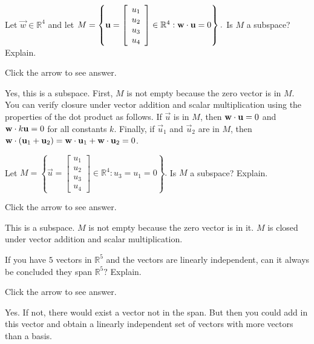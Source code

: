 \documentclass{ximera}
\begin{document}
\begin{problem}\label{prb:5.13} Let $\vec{w}\in \mathbb{R}^{4}$ and let $M=\left\{ \mathbf{u}
=\left[
\begin{array}{c}
u_{1} \\
u_{2} \\
u_{3} \\
u_{4}
\end{array}\right] \in \mathbb{R}^{4}:\mathbf{w}\cdot \mathbf{u}
=0\right\} .$ Is $M$ a subspace? Explain.

Click the arrow to see answer.  
\begin{expandable}{}{}
Yes, this is a subspace.  
First, $M$ is not empty because the zero vector is in $M$.  You can verify closure under vector addition and scalar multiplication using the properties of the dot product as follows.  If $\vec{u}$ is in $M$, then $\mathbf{w}\cdot\mathbf{u}=0$ and $\mathbf{w}\cdot k\mathbf{u}=0$ for all constants $k$.  Finally, if $\vec{u}_1$ and $\vec{u}_2$ are in $M$, then $\mathbf{w}\cdot(\mathbf{u}_1+\mathbf{u}_2)=\mathbf{w}\cdot\mathbf{u}_1+\mathbf{w}\cdot\mathbf{u}_2=0$.
\end{expandable}
\end{problem}

\begin{problem}\label{prb:5.15} Let $M=\left\{ \vec{u}=\left[
\begin{array}{c}
u_{1} \\
u_{2} \\
u_{3} \\
u_{4}
\end{array}\right] \in
\mathbb{R}^{4}:u_{3}=u_{1}=0\right\} .$ Is $M$ a subspace? Explain.

Click the arrow to see answer.  
\begin{expandable}{}{}
This is a subspace. $M$ is not empty because the zero vector is in it.  $M$ is closed  under vector addition and scalar
multiplication.
\end{expandable}
\end{problem}

\begin{problem}\label{prb:5.24} If you have $5$ vectors in $\mathbb{R}^{5}$ and the vectors are
linearly independent, can it always be concluded they span $\mathbb{R}^{5}?$
Explain.

Click the arrow to see answer.  
\begin{expandable}{}{}
 Yes. If not, there would exist a vector not in the span. But then
you could add in this vector and obtain a linearly independent set of
vectors with more vectors than a basis.
\end{expandable}
\end{problem}
\end{document}
